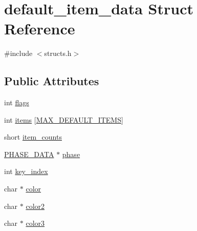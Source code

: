 \hypertarget{structdefault__item__data}{\section{default\-\_\-item\-\_\-data Struct Reference}
\label{structdefault__item__data}
}


{\ttfamily \#include $<$structs.\-h$>$}

\subsection*{Public Attributes}
\begin{DoxyCompactItemize}
\item 
int \hyperlink{structdefault__item__data_a369de5226a234457768cb7a5f7b5bc6d}{flags}
\item 
int \hyperlink{structdefault__item__data_afca11eefdd1f0b777d97779af6e6833e}{items} \mbox{[}\hyperlink{structs_8h_af7510d0aa60174df974ee60ec5c772db}{M\-A\-X\-\_\-\-D\-E\-F\-A\-U\-L\-T\-\_\-\-I\-T\-E\-M\-S}\mbox{]}
\item 
short \hyperlink{structdefault__item__data_a1e897ccb87583497982d1cba47357dc8}{item\-\_\-counts}
\item 
\hyperlink{structs_8h_a946fd03f2da414ee020673d226fbae22}{P\-H\-A\-S\-E\-\_\-\-D\-A\-T\-A} $\ast$ \hyperlink{structdefault__item__data_aa3a491014b7b0fc299471f65ac37b6f8}{phase}
\item 
int \hyperlink{structdefault__item__data_aa7cbd63e2bbe2ef79c29af90a3911fcb}{key\-\_\-index}
\item 
char $\ast$ \hyperlink{structdefault__item__data_a8a4976de1df5d41c62b120f391d82028}{color}
\item 
char $\ast$ \hyperlink{structdefault__item__data_af96b27b213067d107137204932670608}{color2}
\item 
char $\ast$ \hyperlink{structdefault__item__data_a32078627948216bce76bd7ac4375eb78}{color3}
\end{DoxyCompactItemize}


